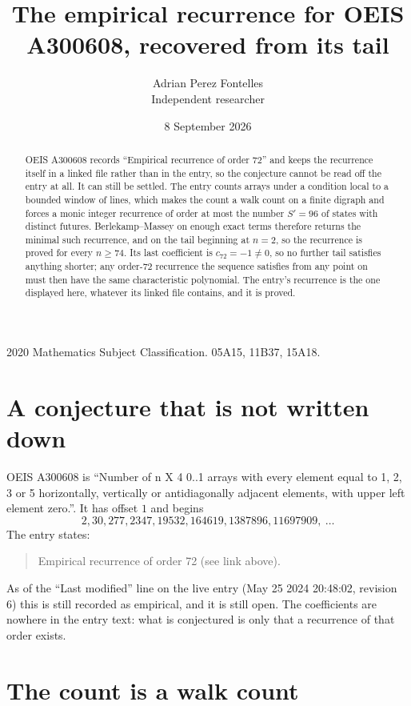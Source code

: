\documentclass[11pt,a4paper]{article}
\title{The empirical recurrence for OEIS A300608, recovered from its tail}
\author{Adrian Perez Fontelles\\ \small Independent researcher}
\date{8 September 2026}
\theoremstyle{plain}
\theoremstyle{definition}
\begin{document}
\maketitle

\begin{abstract}
OEIS A300608 records ``Empirical recurrence of order $72$'' and keeps the recurrence itself in
a linked file rather than in the entry, so the conjecture cannot be read off the entry at all.
It can still be settled. The entry counts arrays under a condition local to a bounded window of
lines, which makes the count a walk count on a finite digraph and forces a monic integer
recurrence of order at most the number $S'=96$ of states with distinct futures. Berlekamp--Massey on
enough exact terms therefore returns the minimal such recurrence, and on the tail beginning at $n=2$, so the recurrence is proved for every $n\ge74$.
Its last coefficient is $c_{72}=-1\neq0$, so no further tail satisfies anything
shorter; any order-$72$ recurrence the sequence satisfies from any point on must then have
the same characteristic polynomial. The entry's recurrence is the one displayed here, whatever
its linked file contains, and it is proved.
\end{abstract}

\noindent\small 2020 Mathematics Subject Classification. 05A15, 11B37, 15A18.\normalsize

\section{A conjecture that is not written down}

OEIS A300608 is ``Number of n X 4 0..1 arrays with every element equal to 1, 2, 3 or 5 horizontally, vertically or antidiagonally adjacent elements, with upper left element zero.''. It has offset $1$ and begins
\[
2, 30, 277, 2347, 19532, 164619, 1387896, 11697909,\ \dots
\]
The entry states:
\begin{quote}
Empirical recurrence of order 72 (see link above).
\end{quote}
As of the ``Last modified'' line on the live entry (May 25 2024 20:48:02, revision 6)
this is still recorded as empirical, and it is still open. The coefficients are nowhere in the
entry text: what is conjectured is only that a recurrence of that order exists.

\section{The count is a walk count}
\end{document}
